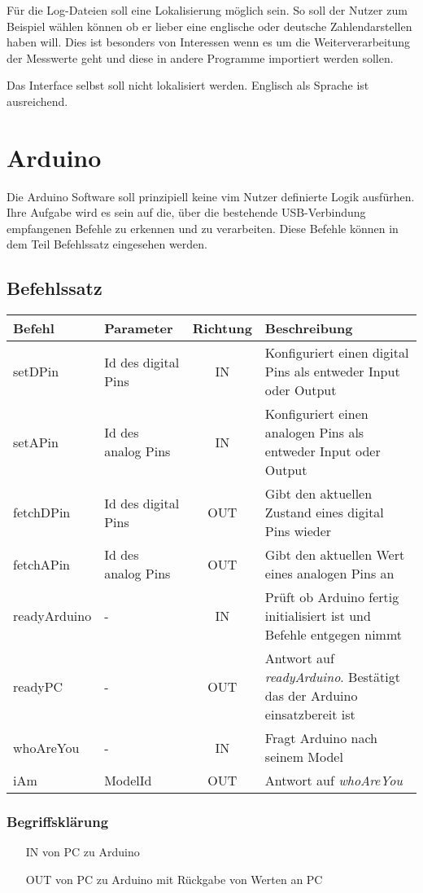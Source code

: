 Für die Log-Dateien soll eine Lokalisierung möglich sein. So soll der Nutzer zum
Beispiel wählen können ob er lieber eine englische oder deutsche
Zahlendarstellen haben will. Dies ist besonders von Interessen wenn es um die
Weiterverarbeitung der Messwerte geht und diese in andere Programme importiert
werden sollen.

Das Interface selbst soll nicht lokalisiert werden. Englisch als Sprache ist 
ausreichend.

\section {Arduino}
Die Arduino Software soll prinzipiell keine vim Nutzer definierte Logik
ausfürhen. Ihre Aufgabe wird es sein auf die, über die bestehende
USB-Verbindung empfangenen Befehle zu erkennen und zu verarbeiten. Diese
Befehle können in dem Teil Befehlssatz eingesehen werden.
\subsection{Befehlssatz}
\begin{tabular}{l|l|c|l}
\textbf{Befehl}&\textbf{Parameter}& 
\textbf{Richtung}&\textbf{Beschreibung}\\\hline
setDPin&Id des digital Pins&IN&Konfiguriert einen digital Pins als entweder
Input oder Output\\
setAPin&Id des analog Pins&IN&Konfiguriert einen analogen Pins als entweder
Input oder Output\\
fetchDPin&Id des digital Pins&OUT&Gibt den aktuellen Zustand eines digital Pins
wieder\\
fetchAPin&Id des analog Pins&OUT&Gibt den aktuellen Wert eines analogen Pins
an\\
readyArduino& - &IN&Prüft ob Arduino fertig initialisiert ist und Befehle 
entgegen nimmt\\
readyPC& - &OUT&Antwort auf \textit{readyArduino}. Bestätigt das der Arduino 
einsatzbereit ist\\
whoAreYou& - &IN&Fragt Arduino nach seinem Model\\
iAm& ModelId &OUT&Antwort auf \textit{whoAreYou}\\
\end{tabular}

\subsubsection{Begriffsklärung}
\begin{itemize}
 \item[IN] von PC zu Arduino
 \item[OUT] von PC zu Arduino mit Rückgabe von Werten an PC
\end{itemize}

